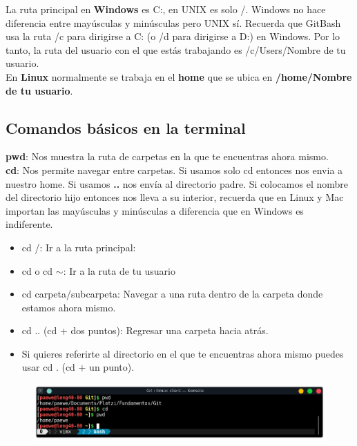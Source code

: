 \documentclass{article}
\begin{document}
La ruta principal en \textbf{Windows} es C:, en UNIX es solo /. Windows no hace
diferencia entre mayúsculas y minúsculas pero UNIX sí. Recuerda que GitBash usa
la ruta /c para dirigirse a C: (o /d para dirigirse a D:) en Windows. Por lo
tanto, la ruta del usuario con el que estás trabajando es /c/Users/Nombre de tu
usuario.\\

En \textbf{Linux} normalmente se trabaja en el \textbf{home} que se ubica en
\textbf{/home/Nombre de tu usuario}.\\

\subsection*{Comandos básicos en la terminal}%

\textbf{pwd}: Nos muestra la ruta de carpetas en la que te encuentras ahora
mismo.\\

\textbf{cd}: Nos permite navegar entre carpetas. Si usamos solo cd entonces nos
envia a nuestro home. Si usamos \textbf{..} nos envía al directorio padre. Si
colocamos el nombre del directorio hijo entonces nos lleva a su interior,
recuerda que en Linux y Mac importan las mayúsculas y minúsculas a diferencia
que en Windows es indiferente.

\begin{itemize}
  \item cd /: Ir a la ruta principal:
  \item cd o cd {$\sim$}: Ir a la ruta de tu usuario
  \item cd carpeta/subcarpeta: Navegar a una ruta dentro de la carpeta donde
    estamos ahora mismo.
  \item cd .. (cd + dos puntos): Regresar una carpeta hacia atrás.
  \item Si quieres referirte al directorio en el que te encuentras ahora
    mismo puedes usar cd . (cd + un punto).
\end{itemize}

\begin{figure}[h!]
  \centering
  \includegraphics[scale=0.75]{./Pictures/058_pwd_cd_home.png}
\end{figure}
\end{document}
